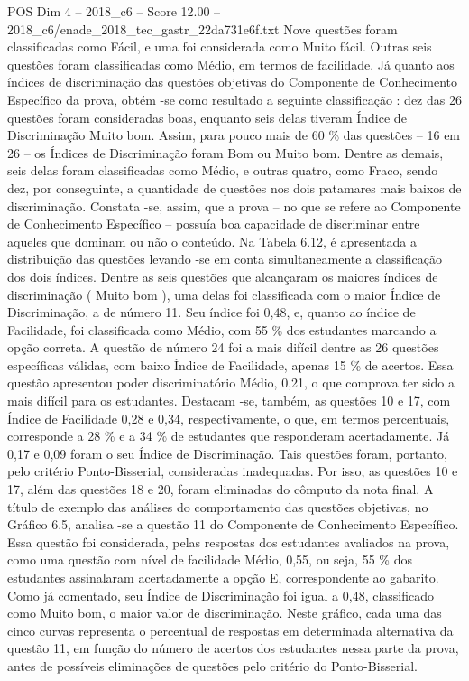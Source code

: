 \begin{textsample}{POS Dim 4 – 2018\_c6 – Score 12.00 – 2018\_c6/enade\_2018\_tec\_gastr\_22da731e6f.txt}
Nove questões foram classificadas como Fácil, e uma foi considerada como Muito fácil.
Outras seis questões foram classificadas como Médio, em termos de facilidade.
Já quanto aos índices de discriminação das questões objetivas do Componente de Conhecimento Específico da prova, obtém -se como resultado a seguinte classificação : dez das 26 questões foram consideradas boas, enquanto seis delas tiveram Índice de Discriminação Muito bom.
Assim, para pouco mais de 60 \% das questões – 16 em 26 – os Índices de Discriminação foram Bom ou Muito bom.
Dentre as demais, seis delas foram classificadas como Médio, e outras quatro, como Fraco, sendo dez, por conseguinte, a quantidade de questões nos dois patamares mais baixos de discriminação.
Constata -se, assim, que a prova – no que se refere ao Componente de Conhecimento Específico – possuía boa capacidade de discriminar entre aqueles que dominam ou não o conteúdo.
Na Tabela 6.12, é apresentada a distribuição das questões levando -se em conta simultaneamente a classificação dos dois índices.
Dentre as seis questões que alcançaram os maiores índices de discriminação ( Muito bom ), uma delas foi classificada com o maior Índice de Discriminação, a de número 11.
Seu índice foi 0,48, e, quanto ao índice de Facilidade, foi classificada como Médio, com 55 \% dos estudantes marcando a opção correta.
A questão de número 24 foi a mais difícil dentre as 26 questões específicas válidas, com baixo Índice de Facilidade, apenas 15 \% de acertos.
Essa questão apresentou poder discriminatório Médio, 0,21, o que comprova ter sido a mais difícil para os estudantes.
Destacam -se, também, as questões 10 e 17, com Índice de Facilidade 0,28 e 0,34, respectivamente, o que, em termos percentuais, corresponde a 28 \% e a 34 \% de estudantes que responderam acertadamente.
Já 0,17 e 0,09 foram o seu Índice de Discriminação.
Tais questões foram, portanto, pelo critério Ponto-Bisserial, consideradas inadequadas.
Por isso, as questões 10 e 17, além das questões 18 e 20, foram eliminadas do cômputo da nota final.
A título de exemplo das análises do comportamento das questões objetivas, no Gráfico 6.5, analisa -se a questão 11 do Componente de Conhecimento Específico.
Essa questão foi considerada, pelas respostas dos estudantes avaliados na prova, como uma questão com nível de facilidade Médio, 0,55, ou seja, 55 \% dos estudantes assinalaram acertadamente a opção E, correspondente ao gabarito.
Como já comentado, seu Índice de Discriminação foi igual a 0,48, classificado como Muito bom, o maior valor de discriminação.
Neste gráfico, cada uma das cinco curvas representa o percentual de respostas em determinada alternativa da questão 11, em função do número de acertos dos estudantes nessa parte da prova, antes de possíveis eliminações de questões pelo critério do Ponto-Bisserial.

\end{textsample}
